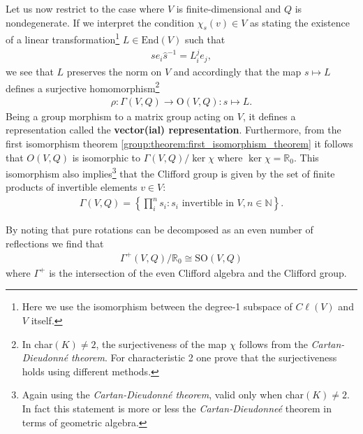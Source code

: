     \begin{property}
        Let us now restrict to the case where $V$ is finite-dimensional and $Q$ is nondegenerate. If we interpret the condition $\chi_s(v)\in V$ as stating the existence of a linear transformation\footnote{Here we use the isomorphism between the degree-1 subspace of $C\ell(V)$ and $V$ itself.} $L\in\text{End}(V)$ such that
        \begin{gather}
            se_i\hat{s}^{-1} = L^j_ie_j,
        \end{gather}
        we see that $L$ preserves the norm on $V$ and accordingly that the map $s\mapsto L$ defines a surjective homomorphism\footnote{In char$(K)\neq2$, the surjectiveness of the map $\chi$ follows from the \textit{Cartan-Dieudonn\'e theorem}. For characteristic 2 one prove that the surjectiveness holds using different methods.}
        \begin{gather}
            \rho:\Gamma(V, Q)\rightarrow\text{O}(V, Q): s\mapsto L.
        \end{gather}
        Being a group morphism to a matrix group acting on $V$, it defines a representation called the \textbf{vector(ial) representation}. Furthermore, from the first isomorphism theorem \ref{group:theorem:first_isomorphism_theorem} it follows that $O(V, Q)$ is isomorphic to $\Gamma(V, Q)/\ker\chi$ where $\ker\chi = \mathbb{R}_0$. This isomorphism also implies\footnote{Again using the \textit{Cartan-Dieudonn\'e theorem}, valid only when char$(K)\neq2$. In fact this statement is more or less the \textit{Cartan-Dieudonne\'e} theorem in terms of geometric algebra.} that the Clifford group is given by the set of finite products of invertible elements $v\in V$:
        \begin{gather}
            \Gamma(V, Q) = \left\{\prod_i^n s_i : s_i\text{ invertible in }V, n\in\mathbb{N}\right\}.
        \end{gather}
    \end{property}
    \begin{result}
        By noting that pure rotations can be decomposed as an even number of reflections we find that
        \begin{gather}
            \Gamma^+(V, Q)/\mathbb{R}_0\cong\text{SO}(V, Q)
        \end{gather}
        where $\Gamma^+$ is the intersection of the even Clifford algebra and the Clifford group.
    \end{result}

